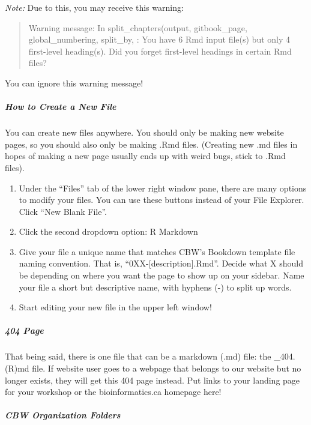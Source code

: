 \documentclass[
]{book}
\providecommand{\tightlist}{%
  \setlength{\itemsep}{0pt}\setlength{\parskip}{0pt}}
\theoremstyle{definition}
\theoremstyle{definition}
\theoremstyle{definition}
\theoremstyle{definition}
\theoremstyle{remark}
\begin{document}
\emph{Note:} Due to this, you may receive this warning:

\begin{quote}
Warning message:
In split\_chapters(output, gitbook\_page, global\_numbering, split\_by, :
You have 6 Rmd input file(s) but only 4 first-level heading(s). Did you forget first-level headings in certain Rmd files?
\end{quote}

You can ignore this warning message!

\subparagraph*{\texorpdfstring{ How to Create a New File }{ How to Create a New File }}\label{how-to-create-a-new-file}

You can create new files anywhere. You should only be making new website pages, so you should also only be making .Rmd files. (Creating new .md files in hopes of making a new page usually ends up with weird bugs, stick to .Rmd files).

\begin{enumerate}
\def\labelenumi{\arabic{enumi}.}
\tightlist
\item
  Under the ``Files'' tab of the lower right window pane, there are many options to modify your files. You can use these buttons instead of your File Explorer. Click ``New Blank File''.
\item
  Click the second dropdown option: R Markdown
\item
  Give your file a unique name that matches CBW's Bookdown template file naming convention. That is, ``0XX-{[}description{]}.Rmd''. Decide what X should be depending on where you want the page to show up on your sidebar. Name your file a short but descriptive name, with hyphens (-) to split up words.
\item
  Start editing your new file in the upper left window!
\end{enumerate}

\subparagraph*{\texorpdfstring{ 404 Page }{ 404 Page }}\label{page}

That being said, there is one file that can be a markdown (.md) file: the \_404.(R)md file. If website user goes to a webpage that belongs to our website but no longer exists, they will get this 404 page instead. Put links to your landing page for your workshop or the bioinformatics.ca homepage here!

\subparagraph*{\texorpdfstring{ CBW Organization Folders }{ CBW Organization Folders }}\label{cbw-organization-folders}
\end{document}
